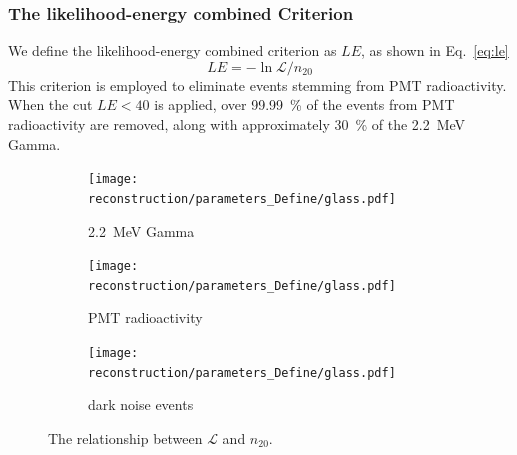 \subsubsection{The likelihood-energy combined Criterion}
We define the likelihood-energy combined criterion as $LE$, as shown in Eq.~\eqref{eq:le}
\begin{equation}
	LE = -\ln \mathcal{L}/n_{20}
	\label{eq:le}
\end{equation}
This criterion is employed to eliminate events stemming from PMT radioactivity. When the cut $LE < 40$ is applied, over \SI{99.99}{\%} of the events from PMT radioactivity are removed, along with approximately \SI{30}{\%} of the \SI{2.2}{MeV} Gamma.
\begin{figure}[h]
	\centering
	\begin{subfigure}{0.5\textwidth} %
		\centering
		\texttt{[image: reconstruction/parameters\_Define/glass.pdf]}
		\caption{\SI{2.2}{MeV} Gamma}
		\label{fig:glass3}
	\end{subfigure}%
	\hfill
	\begin{subfigure}{0.5\textwidth}
		\centering
		\texttt{[image: reconstruction/parameters\_Define/glass.pdf]}
		\caption{PMT radioactivity}
		\label{fig:glass6}
	\end{subfigure}%
	\hfill
	\begin{subfigure}{0.5\textwidth}
		\centering
		\texttt{[image: reconstruction/parameters\_Define/glass.pdf]}
		\caption{dark noise events}
		\label{fig:glass9}
	\end{subfigure}
	\caption{The relationship between $\mathcal{L}$ and $n_{20}$.}
	\label{fig:glass_all}
\end{figure}


